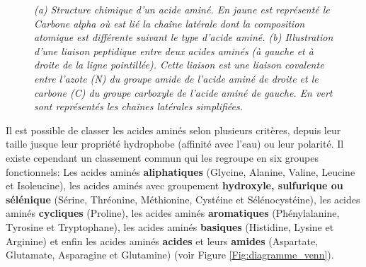 \begin{figure}
\begin{subfigure}{.6\textwidth}
    \caption{}
    \label{Fig:peptide_bond}
  \hspace{0.2cm}
  \end{subfigure}
  \caption{\it (a) Structure chimique d'un acide aminé. En jaune est représenté le Carbone alpha où est lié la chaîne latérale dont la composition atomique est différente suivant le type d'acide aminé.
  (b) Illustration d'une liaison peptidique entre deux acides aminés (à gauche et à droite de la ligne pointillée). Cette liaison est une liaison covalente entre l'azote (N) du groupe amide de l'acide aminé de droite et le carbone (C) du groupe carboxyle de l'acide aminé de gauche. En vert sont représentés les chaînes latérales simplifiées.}
\end{figure}


Il est possible de classer les acides aminés selon plusieurs critères, depuis leur taille jusque leur propriété hydrophobe (affinité avec l'eau) ou leur polarité. Il existe cependant un classement commun qui les regroupe en six groupes fonctionnels: Les acides aminés \textbf{aliphatiques} (Glycine, Alanine, Valine, Leucine et Isoleucine), les acides aminés avec groupement \textbf{hydroxyle, sulfurique ou sélénique} (Sérine, Thréonine, Méthionine, Cystéine et Sélénocystéine), les acides aminés \textbf{cycliques} (Proline), les acides aminés \textbf{aromatiques} (Phénylalanine, Tyrosine et Tryptophane), les acides aminés \textbf{basiques} (Histidine, Lysine et Arginine) et enfin les acides aminés \textbf{acides} et leurs \textbf{amides} (Aspartate, Glutamate, Asparagine et Glutamine) (voir Figure \ref{Fig:diagramme_venn}).

